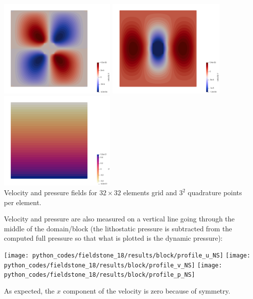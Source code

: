 \begin{center}
\includegraphics[width=5.7cm]{python_codes/fieldstone_18/results/block/NS/u}
\includegraphics[width=5.7cm]{python_codes/fieldstone_18/results/block/NS/v}
\includegraphics[width=5.7cm]{python_codes/fieldstone_18/results/block/NS/p}\\
{\captionfont Velocity and pressure fields for $32\times 32$ elements grid and $3^2$
quadrature points per element.}
\end{center}

Velocity and pressure are also measured on a vertical line going through
the middle of the domain/block (the lithostatic pressure is 
subtracted from the computed full pressure so that what is plotted is the 
dynamic pressure):
\begin{center}
\texttt{[image: python\_codes/fieldstone\_18/results/block/profile\_u\_NS]}
\texttt{[image: python\_codes/fieldstone\_18/results/block/profile\_v\_NS]}
\texttt{[image: python\_codes/fieldstone\_18/results/block/profile\_p\_NS]}
\end{center}
As expected, the $x$ component of the velocity is zero because of symmetry.



